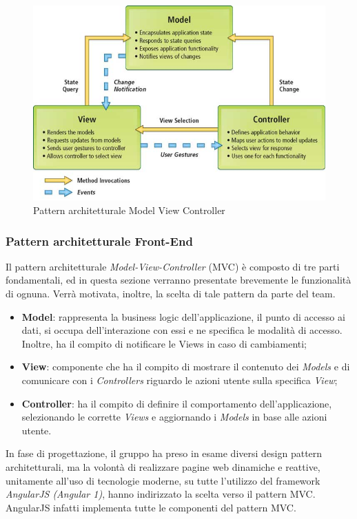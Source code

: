 \begin{figure}[H]
	\centering
	\includegraphics[width=0.7\linewidth]{IMG/MVC_pattern.jpg}
	\caption{Pattern architetturale Model View Controller}
\end{figure}

\subsubsection{Pattern architetturale Front-End}
Il pattern architetturale \textit{Model-View-Controller} (MVC) è composto di tre parti fondamentali, ed in questa sezione verranno presentate brevemente le funzionalità di ognuna. Verrà motivata, inoltre, la scelta di tale pattern da parte del team.

\begin{itemize}
	\item \textbf{Model}: rappresenta la business logic dell'applicazione, il punto di accesso ai dati, si occupa dell'interazione con essi e ne specifica le modalità di accesso. Inoltre, ha il compito di notificare le Views in caso di cambiamenti;
	\item \textbf{View}: componente che ha il compito di mostrare il contenuto dei \textit{Models} e di comunicare con i \textit{Controllers} riguardo le azioni utente sulla specifica \textit{View};
	\item \textbf{Controller}: ha il compito di definire il comportamento dell'applicazione, selezionando le corrette \textit{Views} e aggiornando i \textit{Models} in base alle azioni utente.
\end{itemize}

In fase di progettazione, il gruppo ha preso in esame diversi design pattern architetturali, ma la volontà di realizzare pagine web dinamiche e reattive, unitamente all'uso di tecnologie moderne, su tutte l'utilizzo del framework \textit{AngularJS (Angular 1)}, hanno indirizzato la scelta verso il pattern MVC. AngularJS infatti implementa tutte le componenti del pattern MVC.

